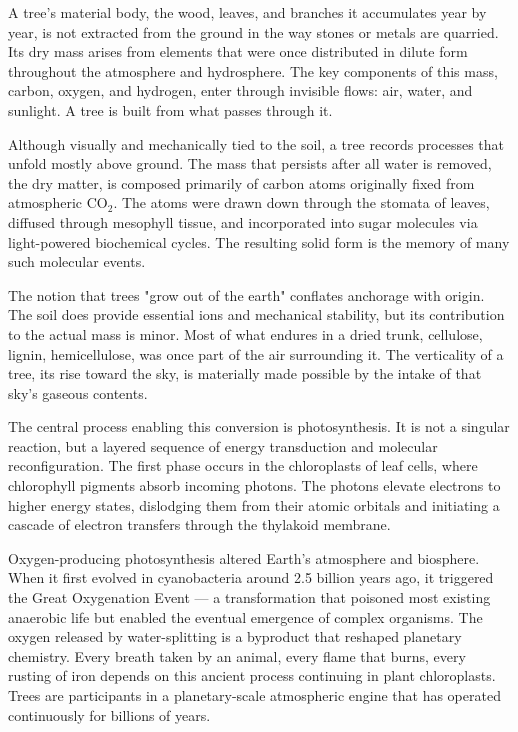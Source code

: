 A tree's material body, the wood, leaves, and branches it accumulates year by year, is not extracted from the ground in the way stones or metals are quarried. Its dry mass arises from elements that were once distributed in dilute form throughout the atmosphere and hydrosphere. The key components of this mass, carbon, oxygen, and hydrogen, enter through invisible flows: air, water, and sunlight. A tree is built from what passes through it.

Although visually and mechanically tied to the soil, a tree records processes that unfold mostly above ground. The mass that persists after all water is removed, the dry matter, is composed primarily of carbon atoms originally fixed from atmospheric \(\mathrm{CO}_2\). The atoms were drawn down through the stomata of leaves, diffused through mesophyll tissue, and incorporated into sugar molecules via light-powered biochemical cycles. The resulting solid form is the memory of many such molecular events.

The notion that trees "grow out of the earth" conflates anchorage with origin. The soil does provide essential ions and mechanical stability, but its contribution to the actual mass is minor. Most of what endures in a dried trunk, cellulose, lignin, hemicellulose, was once part of the air surrounding it. The verticality of a tree, its rise toward the sky, is materially made possible by the intake of that sky's gaseous contents.

The central process enabling this conversion is photosynthesis. It is not a singular reaction, but a layered sequence of energy transduction and molecular reconfiguration. The first phase occurs in the chloroplasts of leaf cells, where chlorophyll pigments absorb incoming photons. The photons elevate electrons to higher energy states, dislodging them from their atomic orbitals and initiating a cascade of electron transfers through the thylakoid membrane.

Oxygen-producing photosynthesis altered Earth's atmosphere and biosphere. When it first evolved in cyanobacteria around 2.5 billion years ago, it triggered the Great Oxygenation Event — a transformation that poisoned most existing anaerobic life but enabled the eventual emergence of complex organisms. The oxygen released by water-splitting is a byproduct that reshaped planetary chemistry. Every breath taken by an animal, every flame that burns, every rusting of iron depends on this ancient process continuing in plant chloroplasts. Trees are participants in a planetary-scale atmospheric engine that has operated continuously for billions of years.

